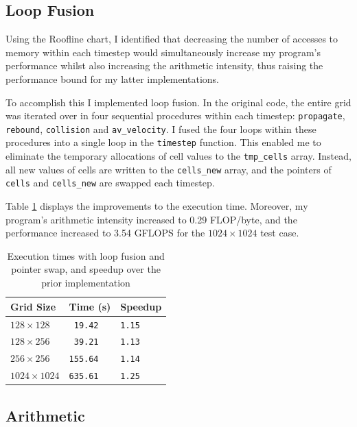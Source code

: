 \documentclass[twocolumn, a4paper]{article}
\begin{document}
\subsection{Loop Fusion}

Using the Roofline chart, I identified that decreasing the number of accesses to memory within each timestep would simultaneously increase my program's performance whilst also increasing the arithmetic intensity, thus raising the performance bound for my latter implementations. 

To accomplish this I implemented loop fusion.
In the original code, the entire grid was iterated over in four sequential procedures within each timestep: \texttt{propagate}, \texttt{rebound}, \texttt{collision} and \texttt{av\_velocity}.
I fused the four loops within these procedures into a single loop in the \texttt{timestep} function.
This enabled me to eliminate the temporary allocations of cell values to the \texttt{tmp\_cells} array.
Instead, all new values of cells are written to the \texttt{cells\_new} array, and the pointers of \texttt{cells} and \texttt{cells\_new} are swapped each timestep.

Table \ref{tab:loop_fusion_pointer_swap} displays the improvements to the execution time.
Moreover, my program's arithmetic intensity increased to 0.29 FLOP/byte, and the performance increased to 3.54 GFLOPS for the $1024 \times 1024$ test case.

\begin{table}[htbp]
  \begin{center}
  \caption{Execution times with loop fusion and pointer swap, and speedup over the prior implementation}\label{tab:loop_fusion_pointer_swap}
  \begin{tabular}[t]{l | l l} 
      \hline\hline
      Grid Size&Time (s)&Speedup\\
      \hline
      $128 \times 128$&\texttt{ 19.42}&\texttt{1.15}\\
      $128 \times 256$&\texttt{ 39.21}&\texttt{1.13}\\
      $256 \times 256$&\texttt{155.64}&\texttt{1.14}\\
      $1024 \times 1024$&\texttt{635.61}&\texttt{1.25}\\
      \hline
    \end{tabular}
  \end{center}
\end{table}

\subsection{Arithmetic}
\end{document}
